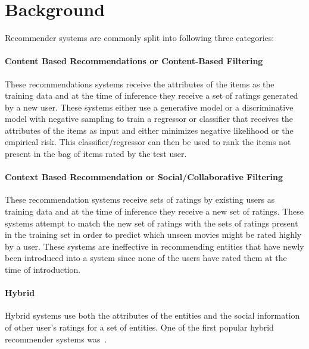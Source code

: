 \documentclass{article}
\begin{document}
\section{Background}
\label{sec:background}
Recommender systems are commonly split into following three categories:
\noindent\paragraph{Content Based Recommendations or Content-Based Filtering} These
    recommendations systems receive the attributes of the items as the training
    data and at the time of inference they receive a set of ratings generated by
    a new user. These systems either use a generative model or a discriminative
    model with negative sampling to train a regressor or classifier that
    receives the attributes of the items as input and either minimizes
    negative likelihood or the empirical risk. This classifier/regressor can
    then be used to rank the items not present in the bag of items rated by the
    test user.

\noindent\paragraph{Context Based Recommendation or Social/Collaborative Filtering} These
    recommendation systems receive sets of ratings by existing users as training
    data and at the time of inference they receive a new set of ratings. These
    systems attempt to match the new set of ratings with the sets of ratings
    present in the training set in order to predict which unseen movies might be
    rated highly by a user. These systems are ineffective in recommending
    entities that have newly been introduced into a system since none of the
    users have rated them at the time of introduction.

\noindent\paragraph{Hybrid} Hybrid systems use both the attributes of the entities and
    the social information of other user's ratings for a set of entities.
    One of the first popular hybrid recommender systems
    was~\cite{basu1998recommendation}.
\end{document}
